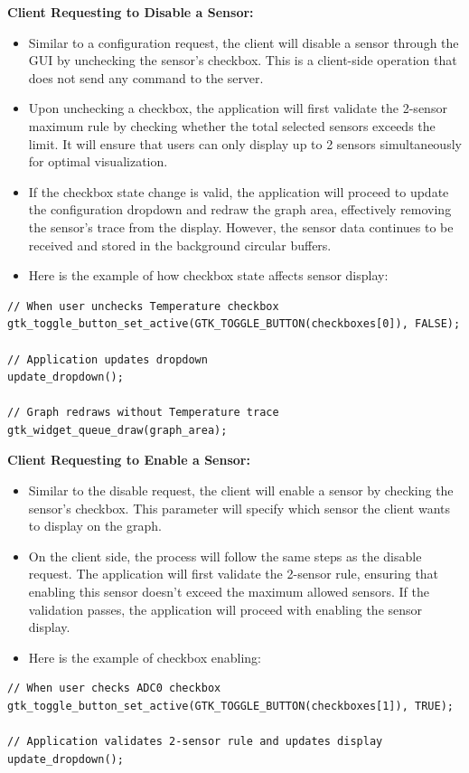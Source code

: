 \textbf{Client Requesting to Disable a Sensor:}
\begin{itemize}
\item Similar to a configuration request, the client will disable a sensor through the GUI
by unchecking the sensor's checkbox. This is a client-side operation that does not
send any command to the server.

\item Upon unchecking a checkbox, the application will first validate the 2-sensor maximum
rule by checking whether the total selected sensors exceeds the limit. It will ensure
that users can only display up to 2 sensors simultaneously for optimal visualization.

\item If the checkbox state change is valid, the application will proceed to update the
configuration dropdown and redraw the graph area, effectively removing the sensor's
trace from the display. However, the sensor data continues to be received and stored
in the background circular buffers.

\item Here is the example of how checkbox state affects sensor display:
\end{itemize}
\begin{verbatim}
// When user unchecks Temperature checkbox
gtk_toggle_button_set_active(GTK_TOGGLE_BUTTON(checkboxes[0]), FALSE);

// Application updates dropdown
update_dropdown();

// Graph redraws without Temperature trace
gtk_widget_queue_draw(graph_area);
\end{verbatim}

\textbf{Client Requesting to Enable a Sensor:}
\begin{itemize}
\item Similar to the disable request, the client will enable a sensor by checking the sensor's checkbox. This parameter will specify which sensor the client wants to display on the graph.
\item On the client side, the process will follow the same steps as the disable request. The application will first validate the 2-sensor rule, ensuring that enabling this sensor doesn't exceed the maximum allowed sensors. If the validation passes, the application will proceed with enabling the sensor display.
\item Here is the example of checkbox enabling:
\end{itemize}
\begin{verbatim}
// When user checks ADC0 checkbox  
gtk_toggle_button_set_active(GTK_TOGGLE_BUTTON(checkboxes[1]), TRUE);

// Application validates 2-sensor rule and updates display
update_dropdown();
\end{verbatim}


